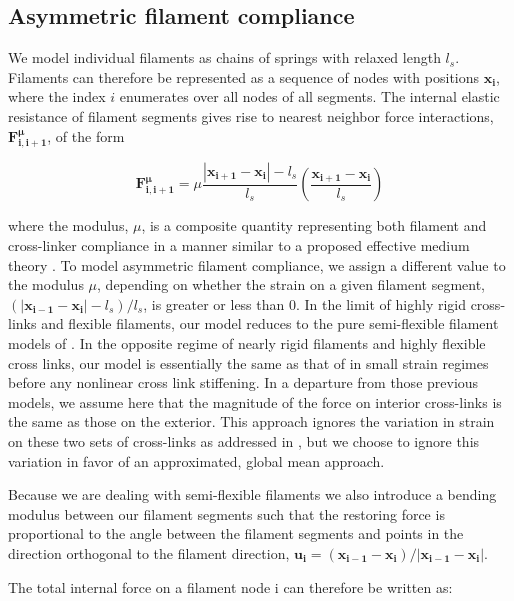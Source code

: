 \documentclass[10pt,letterpaper]{article}
\begin{document}
\subsection*{Asymmetric filament compliance}
We model individual filaments as chains of springs with relaxed length $l_s$.  Filaments can therefore be represented as a sequence of nodes with positions $\mathbf{x_i}$, where the index $i$ enumerates over all nodes of all segments.  The internal elastic resistance of filament segments gives rise to nearest neighbor force interactions, $\mathbf{F^{\mu}_{i,i+1}}$, of the form

\begin{equation}
\label{eqn:spring}
\mathbf{F^{\mu}_{i,i+1}} = \mu\frac{|\mathbf{x_{i+1}}-\mathbf{x_i}|-l_s}{l_s}\left ( \frac{\mathbf{x_{i+1}}-\mathbf{x_i}}{l_s}\right )
\end{equation}


where the modulus, $\mu$, is a composite quantity representing both filament and cross-linker compliance in a manner similar to a proposed effective medium theory \cite{theo_crosslinknonlinear}. To model asymmetric filament compliance, we assign a different value to the modulus $\mu$,  depending on whether the strain on a given filament segment, $(|\mathbf{x_{i-1}}-\mathbf{x_i}|-l_s)/l_s$, is greater or less than 0. In the limit of highly rigid cross-links and flexible filaments, our model reduces to the pure semi-flexible filament models of \cite{theo_hlm,theo_hlm2}. In the opposite regime of nearly rigid filaments and highly flexible cross links, our model is essentially the same as that of \cite{theo_crosslinknonlinear} in small strain regimes before any nonlinear cross link stiffening. In a departure from those previous models, we assume here that the magnitude of the force on interior cross-links is the same as those on the exterior. This approach ignores the variation in strain on these two sets of cross-links as addressed in \cite{theo_crosslinknonlinear}, but we choose to ignore this variation in favor of an approximated, global mean approach. 

Because we are dealing with semi-flexible filaments we also introduce a bending modulus between our filament segments such that the restoring force is proportional to the angle between the filament segments and points in the direction orthogonal to the filament direction, $\mathbf{u_i}=(\mathbf{x_{i-1}}-\mathbf{x_{i}})/|\mathbf{x_{i-1}}-\mathbf{x_{i}}|$.   


The total internal force on a filament node i can therefore be written as:
\end{document}
